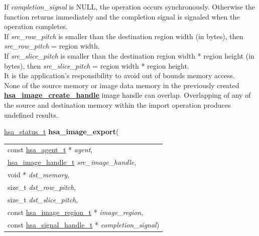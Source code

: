 \documentclass[final]{book}
\newcommand{\hsaarg}[1]{\textit{#1}}
\newcommand{\reffun}[1]{\textbf{#1}}
\begin{document}
\begin{appendices}
If \textit{completion_signal} is NULL, the operation occurs synchronously. Otherwise the function returns immediately and the completion signal is signaled when the operation completes.\\[2mm]
If \textit{src_row_pitch} is smaller than the destination region width (in bytes), then \textit{src_row_pitch} = region width.\\[2mm]
If \textit{src_slice_pitch} is smaller than the destination region width * region height (in bytes), then \textit{src_slice_pitch} = region width * region height.\\[2mm]
It is the application's responsibility to avoid out of bounds memory access.\\[2mm]
None of the source memory or image data memory in the previously created \hyperlink{group--images-1gad80ea369867549c5b313c08134beec83}{\reffun{hsa_image_create_handle}} image handle can overlap. Overlapping of any of the source and destination memory within the import operation produces undefined results. 


\noindent\begin{tcolorbox}[breakable,nobeforeafter,colframe=white,colback=lightgray,left=0mm]
\hyperlink{group--status-1gad755322e7ff95456520e8abdbe90d225}{hsa_status_t} \hypertarget{group--images-1ga40dc94b7a611e0cb4239d8a9951aa6c6}{\textbf{hsa_image_export}}(
\vspace{-3.5mm}\begin{longtable}{@{}p{\textwidth}}
\hspace{1.7em}const \hyperlink{group--topology-1gab8db3fb886332a24acac08ec361e1d86}{hsa_agent_t} * \hsaarg{agent},\\
\hspace{1.7em}\hyperlink{group--images-1ga0aeecea8e818df4cec2eccb3a5e85d5f}{hsa_image_handle_t} \hsaarg{src_image_handle},\\
\hspace{1.7em}void * \hsaarg{dst_memory},\\
\hspace{1.7em}size_t \hsaarg{dst_row_pitch},\\
\hspace{1.7em}size_t \hsaarg{dst_slice_pitch},\\
\hspace{1.7em}const \hyperlink{group--images-1ga9d9acd37f7eb5a68c81b63b5ad082529}{hsa_image_region_t} * \hsaarg{image_region},\\
\hspace{1.7em}const \hyperlink{group--signals-1ga6592c136d70853d855bc11d9efdbf534}{hsa_signal_handle_t} * \hsaarg{completion_signal})\end{longtable}


\end{tcolorbox}
\end{appendices}
\end{document}
